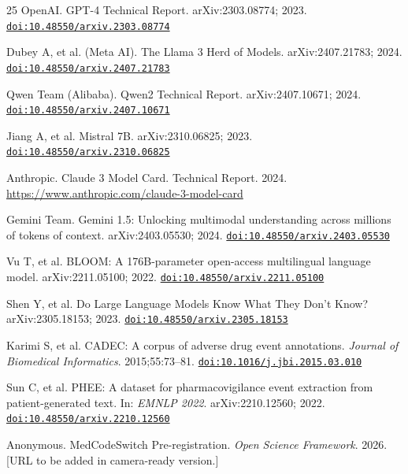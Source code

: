 \documentclass[3p,times,procedia]{elsarticle}
\providecommand{\doi}[1]{\href{https://doi.org/#1}{\nolinkurl{doi:#1}}}
\begin{document}
\begin{thebibliography}{25}
  OpenAI.
  GPT-4 Technical Report.
  arXiv:2303.08774; 2023.
  \doi{10.48550/arxiv.2303.08774}

  Dubey A, et al. (Meta AI).
  The Llama 3 Herd of Models.
  arXiv:2407.21783; 2024.
  \doi{10.48550/arxiv.2407.21783}

  Qwen Team (Alibaba).
  Qwen2 Technical Report.
  arXiv:2407.10671; 2024.
  \doi{10.48550/arxiv.2407.10671}

  Jiang A, et al.
  Mistral 7B.
  arXiv:2310.06825; 2023.
  \doi{10.48550/arxiv.2310.06825}

  Anthropic.
  Claude 3 Model Card. Technical Report. 2024.
  \url{https://www.anthropic.com/claude-3-model-card}

  Gemini Team.
  Gemini 1.5: Unlocking multimodal understanding across millions of
  tokens of context.
  arXiv:2403.05530; 2024.
  \doi{10.48550/arxiv.2403.05530}

  Vu T, et al.
  BLOOM: A 176B-parameter open-access multilingual language model.
  arXiv:2211.05100; 2022.
  \doi{10.48550/arxiv.2211.05100}

  Shen Y, et al.
  Do Large Language Models Know What They Don't Know?
  arXiv:2305.18153; 2023.
  \doi{10.48550/arxiv.2305.18153}

  Karimi S, et al.
  CADEC: A corpus of adverse drug event annotations.
  \emph{Journal of Biomedical Informatics}. 2015;55:73--81.
  \doi{10.1016/j.jbi.2015.03.010}

  Sun C, et al.
  PHEE: A dataset for pharmacovigilance event extraction from
  patient-generated text.
  In: \emph{EMNLP 2022}. arXiv:2210.12560; 2022.
  \doi{10.48550/arxiv.2210.12560}

  Anonymous.
  MedCodeSwitch Pre-registration.
  \emph{Open Science Framework}. 2026.
  [URL to be added in camera-ready version.]

\end{thebibliography}
\end{document}
